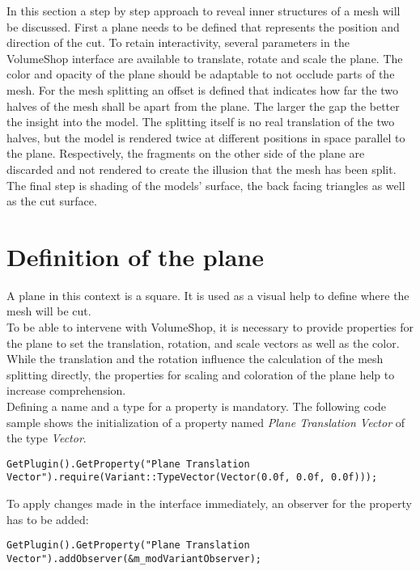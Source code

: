 
In this section a step by step approach to reveal inner structures of a mesh will be discussed. First a plane needs to be defined that represents the position and direction of the cut. To retain interactivity, several parameters in the VolumeShop interface are available to translate, rotate and scale the plane. The color and opacity of the plane should be adaptable to not occlude parts of the mesh. For the mesh splitting an offset is defined that indicates how far the two halves of the mesh shall be apart from the plane. The larger the gap the better the insight into the model. The splitting itself is no real translation of the two halves, but the model is rendered twice at different positions in space parallel to the plane. Respectively, the fragments on the other side of the plane are discarded and not rendered to create the illusion that the mesh has been split. The final step is shading of the models' surface, the back facing triangles as well as the cut surface. 

\section{Definition of the plane}
\label{chap:planeDefinition}
A plane in this context is a square. It is used as a visual help to define where the mesh will be cut.\\
To be able to intervene with VolumeShop, it is necessary to provide properties for the plane to set the translation, rotation, and scale vectors as well as the color. While the translation and the rotation influence the calculation of the mesh splitting directly, the properties for scaling and coloration of the plane help to increase comprehension.\\
Defining a name and a type for a property is mandatory. The following code sample shows the initialization of a property named \emph{Plane Translation Vector} of the type \emph{Vector}.
\begin{lstlisting}
GetPlugin().GetProperty("Plane Translation Vector").require(Variant::TypeVector(Vector(0.0f, 0.0f, 0.0f)));
\end{lstlisting}

To apply changes made in the interface immediately, an observer for the property has to be added:
\begin{lstlisting}
GetPlugin().GetProperty("Plane Translation Vector").addObserver(&m_modVariantObserver);
\end{lstlisting}

